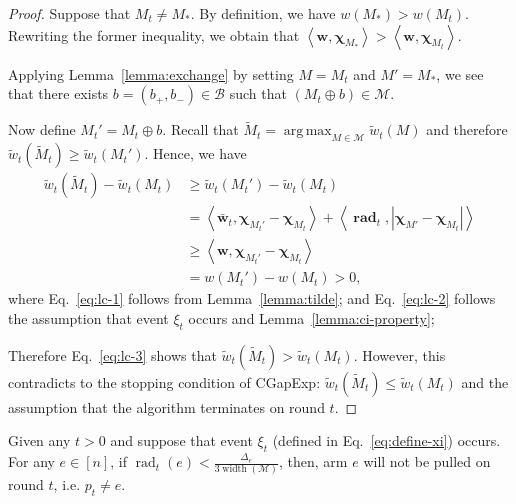 \documentclass{article}
\newcommand{\Algorithm}{{\small \textsf{CGapExp}}\xspace}
\newcommand{\M}{\mathcal M}
\newcommand{\B}{\mathcal B}
\DeclareMathOperator{\rank}{width}
\DeclareMathOperator{\rad}{rad}
\DeclareMathOperator*{\argmax}{arg\,max}
\newcommand{\inn}[1]{\left\langle #1 \right\rangle}
\renewcommand{\vec}[1]{\boldsymbol{#1}}
\begin{document}
\begin{proof}
Suppose that $M_t \not= M_*$. 
By definition, we have $w(M_*)>w(M_t)$. 
Rewriting the former inequality, we obtain that $\inn{\vec w, \vec\chi_{M_*}} > \inn{\vec w,\vec\chi_{M_t}}$.

Applying Lemma~\ref{lemma:exchange} by setting $M=M_t$ and $M'=M_*$, we see that 
there exists $b=(b_+,b_-)\in \B$ such that $(M_t \oplus b) \in \M$.


Now define $M_t' = M_t \oplus b$.
Recall that $\tilde M_t =\argmax_{M\in \M} \tilde w_t(M)$ and therefore $\tilde w_t(\tilde M_t) \ge \tilde w_t(M_t')$.
Hence, we have
\begin{align}
  \tilde w_t(\tilde M_t)-\tilde w_t(M_t) 
  &\ge \tilde w_t(M_t')-\tilde w_t(M_t) \nonumber \\
  &= \inn{\vec {\bar w}_t, \vec \chi_{M_t'}-\vec\chi_{M_t}}+\inn{\vec \rad_t, |\vec \chi_{M'}-\vec\chi_{M_t}|} \label{eq:lc-1}\\
  &\ge \inn{\vec w, \vec \chi_{M_t'}-\vec\chi_{M_t}} \label{eq:lc-2}\\
  &= w(M_t')-w(M_t) > 0 \label{eq:lc-3},
\end{align}
where Eq.~\eqref{eq:lc-1} follows from Lemma~\ref{lemma:tilde};
and Eq.~\eqref{eq:lc-2} follows the assumption that event $\xi_t$ occurs and Lemma~\ref{lemma:ci-property};

Therefore Eq.~\eqref{eq:lc-3} shows that $\tilde w_t(\tilde M_t) > \tilde w_t(M_t)$. 
However, this contradicts to the stopping condition of \Algorithm: $\tilde w_t(\tilde M_t) \le \tilde w_t(M_t)$ and the assumption that the algorithm terminates on round $t$.
\end{proof}




\begin{lemma}
\label{lemma:key-technical}
Given any $t>0$ and suppose that event $\xi_t$ (defined in Eq.~\eqref{eq:define-xi})  occurs.
For any $e\in [n]$, if $\rad_t(e) < \frac{\Delta_e}{3\rank(\M)}$, then, arm $e$ will not be pulled on round $t$, i.e. $p_t\not= e$.
\end{lemma}
\end{document}
